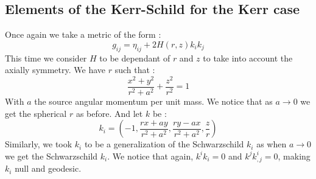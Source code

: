 \documentclass[a4paper,12pt]{article}
\theoremstyle{definition}
\begin{document}
\subsection{Elements of the Kerr-Schild for the Kerr case}
Once again we take a metric of the form :
\begin{equation}
	g_{ij}=\eta_{ij}+2H(r,z)k_ik_j
\end{equation}
This time we consider $H$ to be dependant of $r$ and $z$ to take into account the axially symmetry.
We have $r$ such that :
\begin{equation}
	\frac{x^2+y^2}{r^2+a^2}+\frac{z^2}{r^2}=1
\end{equation}
With $a$ the source angular momentum per unit mass.
We notice that as $a \rightarrow 0$ we get the spherical $r$ as before.
And let $k$ be :
\begin{equation}
	k_i=(-1,\frac{r x + a y}{r^2 + a^2},\frac{ry-ax}{r^2+a^2},\frac{z}{r})
\end{equation}
Similarly, we took $k_i$ to be a generalization of the Schwarzschild $k_i$ as when $a \rightarrow 0$ we get the Schwarzschild $k_i$.
We notice that again, $k^ik_i=0$ and $k^jk^i_{,j}=0$, making $k_i$ null and geodesic.
\end{document}

